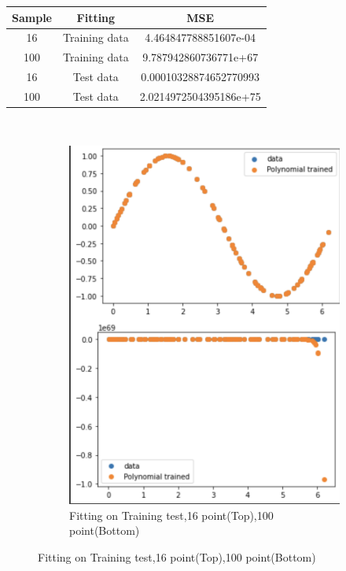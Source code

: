 \documentclass[a4paper]{article}
\theoremstyle{definition}
\newenvironment{soln}{
    \leavevmode\color{blue}\ignorespaces
}{}
\begin{document}
\begin{soln}
\begin{center}
    \begin{tabular}{|c|c|c|}
            \hline
            Sample & Fitting & MSE \\
            \hline
            16 & Training data & 4.464847788851607e-04\\
            100 & Training data  & 9.787942860736771e+67\\
            16 & Test data & 0.00010328874652770993\\
            100 & Test data & 2.0214972504395186e+75 \\
            \hline
        \end{tabular}\\
        \end{center}
    \begin{figure}[H]
    \begin{subfigure}{0.5\textwidth}
            \centering
            \includegraphics[scale=0.5]{train.png}
            \caption{Fitting on Training test,16 point(Top),100 point(Bottom)}

\end{subfigure}
\end{figure}
\end{soln}
\end{document}
